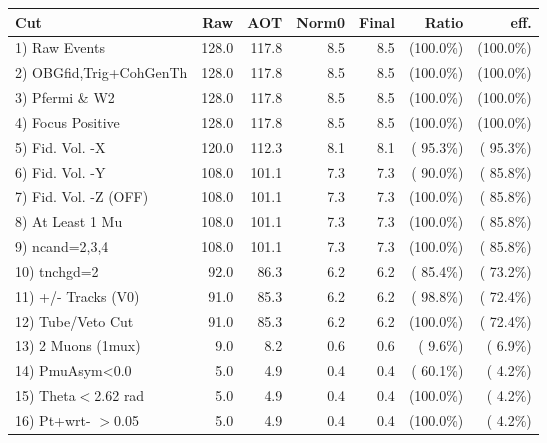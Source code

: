  \begin{table}[h!]\centering
 \begin{tabular}{||l||r|r|r|r|r|r||}
 \hline
 \hline
 Cut & Raw & AOT & Norm0 & Final & Ratio & eff.       \\
 \hline
  1) Raw Events           &        128.0 &        117.8 &          8.5 &          8.5 & (100.0\%) & (100.0\%) \\
  2) OBGfid,Trig+CohGenTh &        128.0 &        117.8 &          8.5 &          8.5 & (100.0\%) & (100.0\%) \\
  3) Pfermi \& W2         &        128.0 &        117.8 &          8.5 &          8.5 & (100.0\%) & (100.0\%) \\
  4) Focus Positive       &        128.0 &        117.8 &          8.5 &          8.5 & (100.0\%) & (100.0\%) \\
  5) Fid. Vol. -X         &        120.0 &        112.3 &          8.1 &          8.1 & ( 95.3\%) & ( 95.3\%) \\
  6) Fid. Vol. -Y         &        108.0 &        101.1 &          7.3 &          7.3 & ( 90.0\%) & ( 85.8\%) \\
  7) Fid. Vol. -Z (OFF)   &        108.0 &        101.1 &          7.3 &          7.3 & (100.0\%) & ( 85.8\%) \\
  8) At Least 1 Mu        &        108.0 &        101.1 &          7.3 &          7.3 & (100.0\%) & ( 85.8\%) \\
  9) ncand=2,3,4          &        108.0 &        101.1 &          7.3 &          7.3 & (100.0\%) & ( 85.8\%) \\
 10) tnchgd=2             &         92.0 &         86.3 &          6.2 &          6.2 & ( 85.4\%) & ( 73.2\%) \\
 11) +/- Tracks (V0)      &         91.0 &         85.3 &          6.2 &          6.2 & ( 98.8\%) & ( 72.4\%) \\
 12) Tube/Veto Cut        &         91.0 &         85.3 &          6.2 &          6.2 & (100.0\%) & ( 72.4\%) \\
 13) 2 Muons (1mux)       &          9.0 &          8.2 &          0.6 &          0.6 & (  9.6\%) & (  6.9\%) \\
 14) PmuAsym<0.0          &          5.0 &          4.9 &          0.4 &          0.4 & ( 60.1\%) & (  4.2\%) \\
 15) Theta$<$2.62 rad     &          5.0 &          4.9 &          0.4 &          0.4 & (100.0\%) & (  4.2\%) \\
 16) Pt+wrt- $>$0.05      &          5.0 &          4.9 &          0.4 &          0.4 & (100.0\%) & (  4.2\%) \\

\end{tabular}
\end{table}
